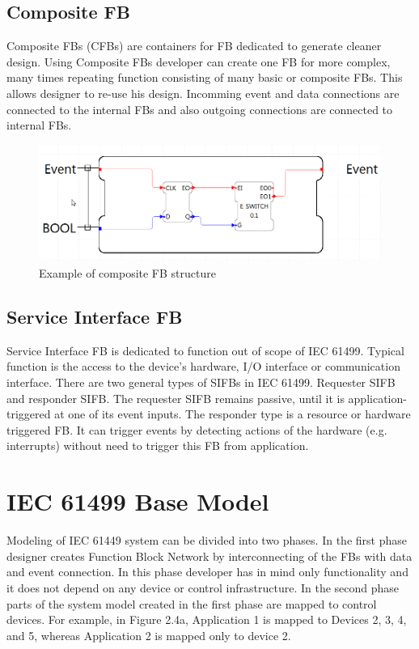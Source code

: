 \subsection{Composite FB}


Composite FBs (CFBs) are containers for FB dedicated to generate cleaner design. Using Composite FBs developer can create one FB for more complex, many times repeating function consisting of many basic or composite FBs. This allows designer to re-use his design. 
Incomming event and data connections are connected to the internal FBs and also outgoing connections are connected to internal FBs.


\begin{figure}[hbp]
\centering
\includegraphics[scale=0.5]{Figures/compositefb}
\decoRule
\caption[IEC 61499 Composite FB]{Example of composite FB structure}
\label{IEC 61499 Composite FB}
\end{figure}

\subsection{Service Interface FB}
Service Interface FB is dedicated to function out of scope of IEC 61499. Typical function is the access to the device's hardware, I/O interface or communication interface. There are two general types of SIFBs in IEC 61499. Requester SIFB and responder SIFB. The requester SIFB remains passive, until it is application-triggered at one of its event inputs. 
The responder type is a resource or hardware triggered FB. It can trigger events by detecting actions of the hardware (e.g. interrupts) without need to trigger this FB from application. 

\section{IEC 61499 Base Model}

Modeling of IEC 61449 system can be divided into two phases. 
In the first phase designer creates Function Block Network by interconnecting of the FBs with data and event connection. In this phase developer has in mind only functionality and it does not depend on any device or control infrastructure. 
In the second phase parts of the system model created in the first phase are mapped to control devices.
For example, in Figure 2.4a, Application 1 is mapped to Devices 2, 3, 4, and 5, whereas Application 2 is mapped only to device 2. 

